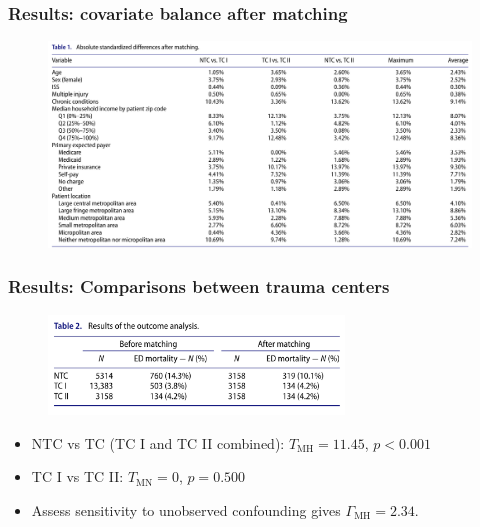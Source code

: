\begin{frame}
  \frametitle{Results: covariate balance after matching}


  \begin{figure}[ht]
    \centering
    \includegraphics[width=\textwidth]{figures/nattino-table1.png}
  \end{figure}


  
\end{frame}


\begin{frame}
  \frametitle{Results: Comparisons between trauma centers}

  \begin{figure}[ht]
    \centering
    \includegraphics[width=0.7\textwidth]{figures/nattino-table2.png}
  \end{figure}

  \begin{itemize}
  \item NTC vs TC (TC I and TC II combined): $T_\text{MH}=11.45$, $p<0.001$ \medskip 
  \item TC I vs TC II: $T_\text{MN} = 0$, $p = 0.500$ \medskip 
  \item Assess sensitivity to unobserved confounding
    \citep{rosenbaum1987} gives $\Gamma_{\text{MH}} = 2.34$.
  \end{itemize}
  
\end{frame}


  

  
  
  

